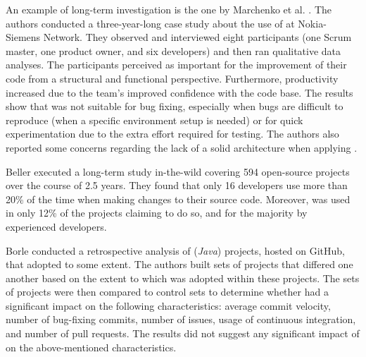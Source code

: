 An example of long-term investigation is the one by Marchenko et al. \cite{DBLP:conf/xpu/MarchenkoAI09}. The authors conducted a three-year-long case study about the use of \tdd at Nokia-Siemens Network. They observed and interviewed eight participants (one Scrum master, one product owner, and six developers) and then ran qualitative data analyses. 
The participants perceived \tdd as important for the improvement of their code from a structural and functional perspective. Furthermore, productivity increased due to the team's improved confidence with the code base. The results show that \tdd was not suitable for bug fixing, especially when bugs are difficult to reproduce (\eg when a specific environment setup is needed) or for quick experimentation due to the extra effort required for testing. The authors also reported some concerns regarding the lack of a solid architecture when applying \tdd.

Beller \etal \cite{DBLP:journals/tse/BellerGPPAZ19} executed a long-term study in-the-wild covering 594 open-source projects over the course of 2.5 years. They found that only 16 developers use \tdd more than 20\% of the time when making changes to their source code.
Moreover, \tdd was used in only 12\% of the projects claiming to do so, and for the majority by experienced developers.

Borle \etal \cite{DBLP:journals/ese/BorleFSGH18} conducted a retrospective analysis of (\textit{Java}) projects, hosted on GitHub, that adopted \tdd to some extent. The authors built sets of \tdd projects that differed one another based on the extent to which \tdd was adopted within these projects. The sets of \tdd projects were then compared to control sets to determine whether \tdd had a significant impact on the following characteristics: average commit velocity, number of bug-fixing commits, number of issues, usage of continuous integration, and number of pull requests. The results did not suggest any significant impact of \tdd on the above-mentioned characteristics.

